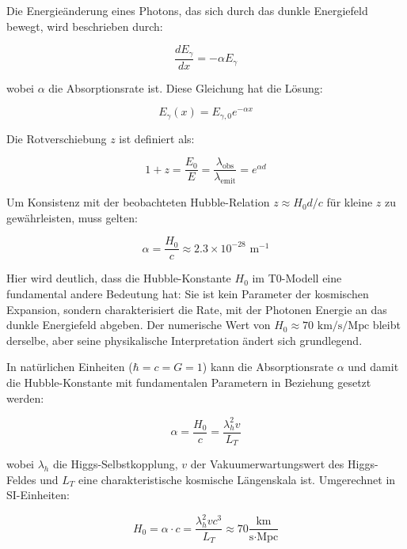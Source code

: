 \documentclass[a4paper,12pt]{article}
\theoremstyle{definition}
\theoremstyle{remark}
\begin{document}
	Die Energieänderung eines Photons, das sich durch das dunkle Energiefeld bewegt, wird beschrieben durch:
	
	\begin{equation}
		\frac{dE_{\gamma}}{dx} = -\alpha E_{\gamma}
	\end{equation}
	
	wobei $\alpha$ die Absorptionsrate ist. Diese Gleichung hat die Lösung:
	
	\begin{equation}
		E_{\gamma}(x) = E_{\gamma,0} e^{-\alpha x}
	\end{equation}
	
	Die Rotverschiebung $z$ ist definiert als:
	
	\begin{equation}
		1 + z = \frac{E_0}{E} = \frac{\lambda_{\text{obs}}}{\lambda_{\text{emit}}} = e^{\alpha d}
	\end{equation}
	
	Um Konsistenz mit der beobachteten Hubble-Relation $z \approx H_0 d/c$ für kleine $z$ zu gewährleisten, muss gelten:
	
	\begin{equation}
		\alpha = \frac{H_0}{c} \approx 2.3 \times 10^{-28} \text{ m}^{-1}
	\end{equation}
	
	Hier wird deutlich, dass die Hubble-Konstante $H_0$ im T0-Modell eine fundamental andere Bedeutung hat: Sie ist kein Parameter der kosmischen Expansion, sondern charakterisiert die Rate, mit der Photonen Energie an das dunkle Energiefeld abgeben. Der numerische Wert von $H_0 \approx 70 \text{ km/s/Mpc}$ bleibt derselbe, aber seine physikalische Interpretation ändert sich grundlegend.
	
	In natürlichen Einheiten ($\hbar = c = G = 1$) kann die Absorptionsrate $\alpha$ und damit die Hubble-Konstante mit fundamentalen Parametern in Beziehung gesetzt werden:
	
	\begin{equation}
		\alpha = \frac{H_0}{c} = \frac{\lambda_h^2 v}{L_T}
	\end{equation}
	
	wobei $\lambda_h$ die Higgs-Selbstkopplung, $v$ der Vakuumerwartungswert des Higgs-Feldes und $L_T$ eine charakteristische kosmische Längenskala ist. Umgerechnet in SI-Einheiten:
	
	\begin{equation}
		H_0 = \alpha \cdot c = \frac{\lambda_h^2 v c^3}{L_T} \approx 70 \frac{\text{km}}{\text{s} \cdot \text{Mpc}}
	\end{equation}
	
\end{document}

